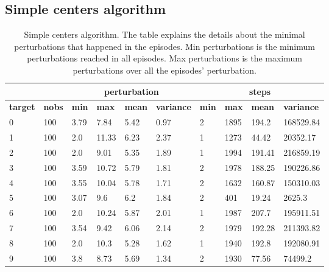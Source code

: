 \documentclass{article}
\begin{document}
\subsection{Simple centers algorithm}
\begin{table}[h]
\caption{Simple centers algorithm. The table explains the details about the minimal perturbations that happened in the episodes. Min perturbations is the minimum perturbations reached in all episodes. Max perturbations is the maximum perturbations over all the episodes' perturbation.}
\label{tab:simple_result}
\begin{tabular}{|l|l|l|l|l|l|l|l|l|l|}
\hline
\textbf{}       & \textbf{}     & \multicolumn{4}{c|}{\textbf{perturbation}}                      & \multicolumn{4}{c|}{\textbf{steps}}                             \\ \hline
\textbf{target} & \textbf{nobs} & \textbf{min} & \textbf{max} & \textbf{mean} & \textbf{variance} & \textbf{min} & \textbf{max} & \textbf{mean} & \textbf{variance} \\ \hline
0 & 100  & 3.79     & 7.84     & 5.42      & 0.97          & 2         & 1895      & 194.2      & 168529.84      \\ \hline
1 & 100  & 2.0      & 11.33    & 6.23      & 2.37          & 1         & 1273      & 44.42      & 20352.17       \\ \hline
2 & 100  & 2.0      & 9.01     & 5.35      & 1.89          & 1         & 1994      & 191.41     & 216859.19      \\ \hline
3 & 100  & 3.59     & 10.72    & 5.79      & 1.81          & 2         & 1978      & 188.25     & 190226.86      \\ \hline
4 & 100  & 3.55     & 10.04    & 5.78      & 1.71          & 2         & 1632      & 160.87     & 150310.03      \\ \hline
5 & 100  & 3.07     & 9.6      & 6.2       & 1.84          & 2         & 401       & 19.24      & 2625.3         \\ \hline
6 & 100  & 2.0      & 10.24    & 5.87      & 2.01          & 1         & 1987      & 207.7      & 195911.51      \\ \hline
7 & 100  & 3.54     & 9.42     & 6.06      & 2.14          & 2         & 1979      & 192.28     & 211393.82      \\ \hline
8 & 100  & 2.0      & 10.3     & 5.28      & 1.62          & 1         & 1940      & 192.8      & 192080.91      \\ \hline
9 & 100  & 3.8      & 8.73     & 5.69      & 1.34          & 2         & 1930      & 77.56      & 74499.2        \\ \hline
\end{tabular}
\end{table}
\end{document}
